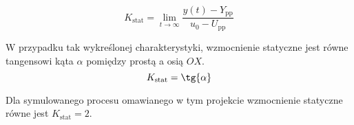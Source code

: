 \begin{equation}
K_{\mathrm{stat}} = \lim_{t \to \infty} \frac{y(t)- Y_{\mathrm{pp}}}{u_0 - U_{\mathrm{pp}}}
\end{equation}

W przypadku tak wykreślonej charakterystyki, wzmocnienie statyczne jest równe tangensowi kąta $\alpha$
pomiędzy prostą a osią $OX$. 
\begin{equation}
K_{\mathrm{stat}} = \tg{\alpha}
\end{equation}

Dla symulowanego procesu omawianego w tym projekcie wzmocnienie statyczne 
równe jest $K_{\mathrm{stat}} = 2$. 



